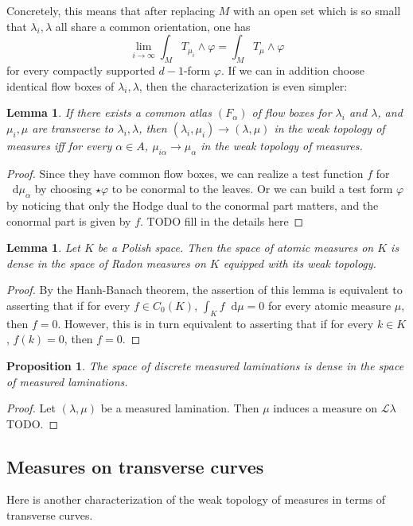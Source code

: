 \documentclass[reqno,10pt]{amsart}
\newcommand*\dif{\mathop{}\!\mathrm{d}}
\newcommand{\Leaves}{\mathscr L}
\newtheorem{lemma}[theorem]{Lemma}
\newtheorem{proposition}[theorem]{Proposition}
\theoremstyle{definition}
\numberwithin{equation}{section}
\begin{document}
Concretely, this means that after replacing $M$ with an open set which is so small that $\lambda_i, \lambda$ all share a common orientation, one has
$$\lim_{i \to \infty} \int_M T_{\mu_i} \wedge \varphi = \int_M T_\mu \wedge \varphi$$
for every compactly supported $d-1$-form $\varphi$.
If we can in addition choose identical flow boxes of $\lambda_i, \lambda$, then the characterization is even simpler:

\begin{lemma}
If there exists a common atlas $(F_\alpha)$ of flow boxes for $\lambda_i$ and $\lambda$, and $\mu_i, \mu$ are transverse to $\lambda_i, \lambda$, then $(\lambda_i, \mu_i) \to (\lambda, \mu)$ in the weak topology of measures iff for every $\alpha \in A$, $\mu_{i\alpha} \to \mu_\alpha$ in the weak topology of measures.
\end{lemma}
\begin{proof}
Since they have common flow boxes, we can realize a test function $f$ for $\dif \mu_\alpha$ by choosing $\star \varphi$ to be conormal to the leaves.
Or we can build a test form $\varphi$ by noticing that only the Hodge dual to the conormal part matters, and the conormal part is given by $f$.
TODO fill in the details here
\end{proof}

\begin{lemma}
Let $K$ be a Polish space.
Then the space of atomic measures on $K$ is dense in the space of Radon measures on $K$ equipped with its weak topology.
\end{lemma}
\begin{proof}
By the Hanh-Banach theorem, the assertion of this lemma is equivalent to asserting that if for every $f \in C_0(K)$, $\int_K f \dif \mu = 0$ for every atomic measure $\mu$, then $f = 0$.
However, this is in turn equivalent to asserting that if for every $k \in K$, $f(k) = 0$, then $f = 0$.
\end{proof}

\begin{proposition}
The space of discrete measured laminations is dense in the space of measured laminations.
\end{proposition}
\begin{proof}
Let $(\lambda, \mu)$ be a measured lamination. Then $\mu$ induces a measure on $\Leaves \lambda$ TODO.
\end{proof}


\subsection{Measures on transverse curves}
Here is another characterization of the weak topology of measures in terms of transverse curves.
\end{document}
